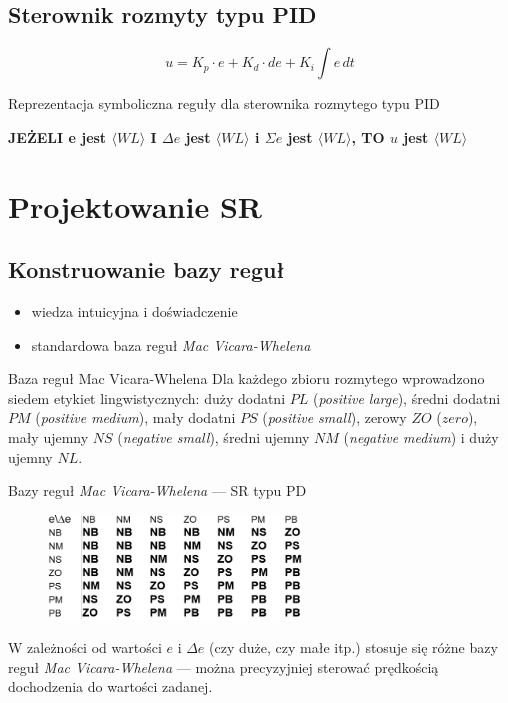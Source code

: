 	
	\subsection{Sterownik rozmyty typu PID}
	\begin{frame}
		\centering
		\begin{equation}
			u=K_p \cdot e + K_d \cdot de + K_i \int\! e\,dt
		\end{equation}
		
		Reprezentacja symboliczna reguły dla sterownika rozmytego typu PID \bigskip
		
			\textbf{JEŻELI e jest $\langle WL \rangle$ I $\Delta e$ jest $\langle WL \rangle$ i $\Sigma e$ jest $\langle WL \rangle$,  TO $u$ jest $\langle WL \rangle$}
	\end{frame}
	
	\section{Projektowanie SR}
		\subsection{Konstruowanie bazy reguł}
		\begin{frame}
		\begin{itemize}
			\item wiedza intuicyjna i doświadczenie
			\item standardowa baza reguł \emph{Mac Vicara-Whelena}
		\end{itemize}
		\end{frame}
		
		\begin{frame}{Baza reguł Mac Vicara-Whelena}
			Dla każdego zbioru rozmytego wprowadzono siedem etykiet
			lingwistycznych: duży dodatni $PL$ (\emph{positive large}),
			średni dodatni $PM$ (\emph{positive medium}), mały dodatni $PS$ (\emph{positive small}),
			zerowy $ZO$ ($zero$), mały ujemny $NS$ (\emph{negative small}), średni ujemny $NM$ 
			(\emph{negative medium}) i duży ujemny $NL$.
		\end{frame}
		
		\begin{frame}{Bazy reguł \emph{Mac Vicara-Whelena} --- SR typu PD}
			\begin{figure}
				\includegraphics[width=0.6\textwidth]{img/pd}
			\end{figure}
			W zależności od wartości $e$ i $\Delta e$ (czy duże, czy małe itp.) stosuje się różne
			bazy reguł \emph{Mac Vicara-Whelena} --- można precyzyjniej sterować prędkością
			dochodzenia do wartości zadanej.
		\end{frame}
		
